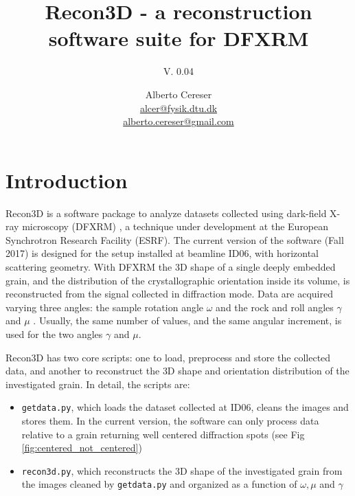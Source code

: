 \documentclass[11pt]{scrartcl}
\begin{document}
%
\author{Alberto Cereser\\  
\href{mailto:alcer@fysik.dtu.dk}{alcer@fysik.dtu.dk}\\
\href{mailto:alberto.cereser@gmail.com}{alberto.cereser@gmail.com}}
\title{Recon3D - a reconstruction software suite for DFXRM}
\subtitle{V. 0.04}
\maketitle

\tableofcontents

\section{Introduction}

Recon3D is a software package to analyze datasets collected using dark-field X-ray microscopy ({\footnotesize{DFXRM}}) {\cite{dfxrm_nat_comm}}, a technique under development at the European Synchrotron Research Facility ({\footnotesize{ESRF}}). The current version of the software (Fall 2017) is designed for the setup installed at beamline {\footnotesize{ID06}}, with horizontal scattering geometry. With {\footnotesize{DFXRM}} the {\footnotesize{3D}} shape of a single deeply embedded grain, and the distribution of the crystallographic orientation inside its volume, is reconstructed from the signal collected in diffraction mode. Data are acquired varying three angles: the sample rotation angle $\omega$ and the rock and roll angles $\gamma$ and $\mu$ \cite{henning_joac}. Usually, the same number of values, and the same angular increment, is used for the two angles $\gamma$ and $\mu$. 

Recon3D has two core scripts: one to load, preprocess and store the collected data, and another to reconstruct the {\footnotesize{3D}} shape and orientation distribution of the investigated grain. In detail, the scripts are:
\begin{itemize}
    \item {\texttt{getdata.py}}, which loads the dataset collected at {\footnotesize{ID06}}, cleans the images and stores them. In the current version, the software can only process data relative to a grain returning well centered diffraction spots (see Fig \ref{fig:centered_not_centered})
    \item {\texttt{recon3d.py}}, which reconstructs the {\footnotesize{3D}} shape of the investigated grain from the images cleaned by {\texttt{getdata.py}} and organized as a function of $\omega, \mu$ and $\gamma$
\end{itemize}
\end{document}
